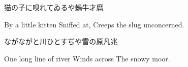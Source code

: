 \begin{haiku}
    {\FH 猫の子に嗅れてゐるや蝸牛}\hfill{\FH 才麿}

    \vin{} By a little kitten
    \vin{} \vin{} Sniffed at,
    \vin{} \vin{} \vin{} Creeps the slug unconcerned.
\end{haiku}

\begin{haiku}
    {\FH ながながと川ひとすぢや雪の原}\hfill{\FH 凡兆}

    \vin{} One long line of river
    \vin{} \vin{} Winds across
    \vin{} \vin{} \vin{} The snowy moor.
\end{haiku}
